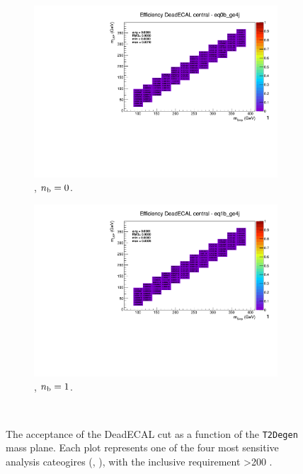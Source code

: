\begin{figure}[h!]
\begin{subfigure}[b]{0.4\textwidth}
  \end{subfigure}\\
  \begin{subfigure}[b]{0.4\textwidth}
    \includegraphics[width=\textwidth, page=5]{Figs/sms/t2degen/v19/systs_v2/T2_4body_DeadECAL_eq0b_ge4j.pdf}
    \caption{\njhigh, $n_{\text{b}} = 0$.}
  \end{subfigure}
  \begin{subfigure}[b]{0.4\textwidth}
    \includegraphics[width=\textwidth, page=5]{Figs/sms/t2degen/v19/systs_v2/T2_4body_DeadECAL_eq1b_ge4j.pdf}
    \caption{\njhigh, $n_{\text{b}} = 1$.}
  \end{subfigure}\\
  \caption{The acceptance of the DeadECAL cut as a function of the \texttt{T2Degen}
  mass plane. Each plot represents one of the four most sensitive 
  analysis cateogires (\nb, \nj), with the inclusive requirement \HT>200 \gev.}
  \label{fig:sms-deadecal-t2degen}
\end{figure}

